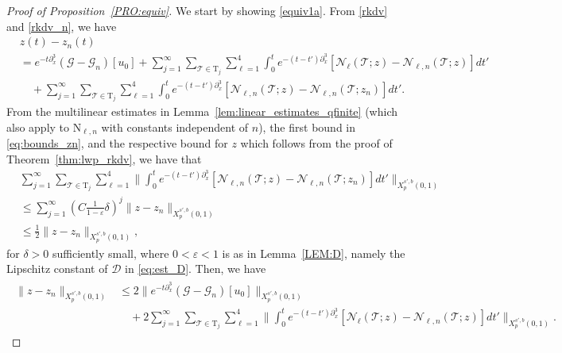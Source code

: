 \documentclass[a4paper,
11pt,  reqno]{amsart}
\newcommand{\5}{\textup{V}}
\newcommand{\dl}{\delta}
\newcommand{\eps}{\varepsilon}
\newcommand{\dx}{\partial_x}
\theoremstyle{remark}
\newcommand{\TT}{\mathcal{T}}
\newcommand{\Tr}{\mathrm{T}}
\renewcommand{\l}{\ell}
\newcommand{\Gc}{\mathcal{G}}
\numberwithin{equation}{section}
\numberwithin{theorem}{section}
\newcommand{\NN}{\mathrm{N}}
\newcommand{\Ncal}{\mathcal{N}}
\newcommand{\DD}{\mathcal{D}}
\begin{document}
\begin{proof}[Proof of Proposition~\ref{PRO:equiv}]
We start by showing \eqref{equiv1a}.
From \eqref{rkdv} and \eqref{rkdv_n}, we have
\begin{align}
&
z(t) - z_n(t)
\\
&
= e^{-t\dx^3} (\Gc - \Gc_n)[u_0]
+ \sum_{j=1}^\infty \sum_{\TT\in\Tr_j} \sum_{\l=1}^4 \int_0^t e^{-(t-t')\dx^3} [\Ncal_{\l}(\TT; z) - \Ncal_{\l, n}(\TT;z)]  dt'
\\
&
\quad
+ \sum_{j=1}^\infty \sum_{\TT\in\Tr_j} \sum_{\l=1}^4
\int_0^t e^{-(t-t')\dx^3} [\Ncal_{\l, n}(\TT; z) - \Ncal_{\l, n}(\TT;z_n)]  dt'.
\end{align}
From the multilinear estimates in Lemma~\ref{lem:linear_estimates_qfinite} (which also apply to $\NN_{\l,n}$ with constants independent of $n$), the first bound in \eqref{eq:bounds_zn}, and the respective bound for $z$ which follows from the proof of Theorem~\ref{thm:lwp_rkdv}, we have that
\begin{align}
&
\sum_{j=1}^\infty \sum_{\TT\in\Tr_j} \sum_{\l=1}^4
\bigg\|
\int_0^t e^{-(t-t')\dx^3} [\Ncal_{\l, n}(\TT; z) - \Ncal_{\l, n}(\TT;z_n)]  dt' \bigg\|_{X^{s',b}_p(0,1)}
\\
&
\le \sum_{j=1}^\infty ( C \tfrac{1}{1-\eps} \dl )^{j} \| z-z_n\|_{X^{s',b}_p(0,1)} \\
&
\le  \tfrac12 \| z-z_n\|_{X^{s',b}_p(0,1)} ,
\end{align}
for $\dl>0$ sufficiently small, where $0<\eps<1$ is as in Lemma~\ref{LEM:D}, namely the Lipschitz constant of $\DD$ in \eqref{eq:est_D}.
Then, we have
\begin{align}
\label{equiv1aa}
\begin{split}
\| z - z_n \|_{X^{s',b}_p(0,1)}
&
\le
2 \|e^{-t\dx^3} (\Gc - \Gc_n)[u_0]\|_{X^{s',b}_p(0,1)}
\\
&
\quad
+
2
\sum_{j=1}^\infty \sum_{\TT\in\Tr_j} \sum_{\l=1}^4
\bigg\| \int_0^t e^{-(t-t')\dx^3} [\Ncal_{\l}(\TT; z) - \Ncal_{\l, n}(\TT;z)]  dt' \bigg\|_{X^{s',b}_p(0,1)}.
\end{split}
\end{align}




\end{proof}
\end{document}
